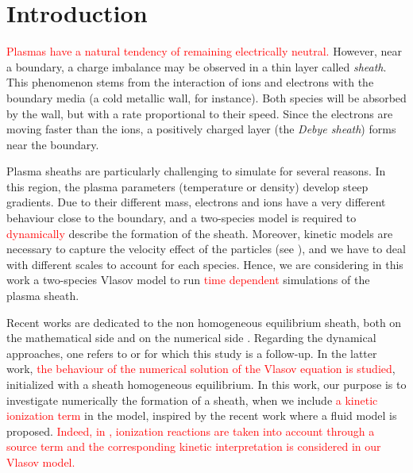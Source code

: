 \documentclass{article}
\numberwithin{equation}{section}
\begin{document}
\section*{Introduction}
\textcolor{red}{Plasmas have a natural tendency of remaining electrically neutral.}
However, near a boundary, a charge imbalance may be observed in a thin layer called \emph{sheath}.
This phenomenon stems from the interaction of ions and electrons with the boundary media (a cold metallic wall, for instance). Both species will be absorbed by the wall, but with a rate proportional to their speed. Since the electrons are moving %
faster than the ions, a positively charged layer (the \emph{Debye sheath}) forms near the boundary. 

Plasma sheaths are particularly challenging to simulate for several reasons. In this region, 
the plasma parameters (temperature or density) develop steep gradients. Due to their different mass, 
electrons and ions have a very different behaviour close to the boundary, and a two-species model is required 
to \textcolor{red}{dynamically} describe the formation of the sheath. Moreover, kinetic models are necessary to capture the velocity 
effect of the particles (see \cite{riemannBohmCriterionSheath1991, Sun22, cagas2018}), and we have to deal with %
different scales to account for each species.  Hence, we are considering in this work 
a two-species Vlasov model to run \textcolor{red}{time dependent} simulations of the plasma sheath. 

Recent works are dedicated to the non homogeneous equilibrium sheath, both on the mathematical side and on the numerical side \cite{despresMinimizationFormulationBikinetic2016, badsiCollisionalSheathSolutions2021, badsiStableFixedPoint2021}. 
Regarding the dynamical approaches, one refers to \cite{couletteEulerianVlasovCode2014,bourneNonUniformSplinesSemiLagrangian2022} 
or \cite{badsiNumericalStabilityPlasma2018} for which this study is a follow-up. 
In the latter work, \textcolor{red}{the behaviour of the numerical solution of the Vlasov equation is studied}, initialized with a sheath
homogeneous equilibrium. In this work, our purpose is to investigate numerically the formation of a sheath,  
when we include \textcolor{red}{a kinetic ionization term} in the model, inspired by the recent work
\cite{alvarezlagunaAsymptoticPreservingWellbalanced2020} where a fluid model is proposed.    
\textcolor{red}{Indeed, in \cite{alvarezlagunaAsymptoticPreservingWellbalanced2020}, ionization reactions are taken into account through a 
source term and the corresponding kinetic interpretation is considered in our Vlasov model. }
\end{document}
